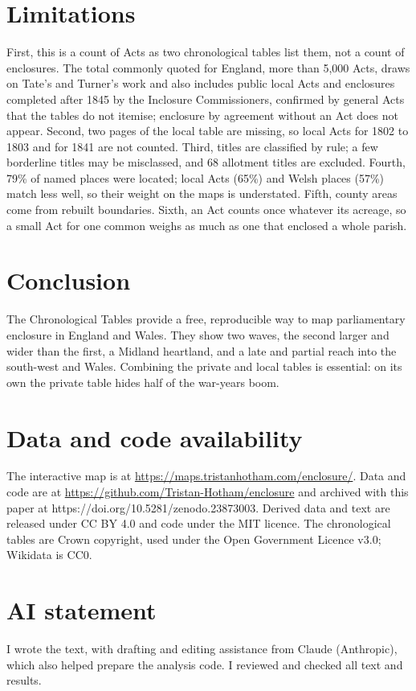 \documentclass[11pt,a4paper]{article}
\begin{document}
\section{Limitations}
First, this is a count of Acts as two chronological tables list them, not a count of enclosures. The total commonly quoted for England, more than 5,000 Acts, draws on Tate's and Turner's work and also includes public local Acts and enclosures completed after 1845 by the Inclosure Commissioners, confirmed by general Acts that the tables do not itemise; enclosure by agreement without an Act does not appear. Second, two pages of the local table are missing, so local Acts for 1802 to 1803 and for 1841 are not counted. Third, titles are classified by rule; a few borderline titles may be misclassed, and 68 allotment titles are excluded. Fourth, 79\% of named places were located; local Acts (65\%) and Welsh places (57\%) match less well, so their weight on the maps is understated. Fifth, county areas come from rebuilt boundaries. Sixth, an Act counts once whatever its acreage, so a small Act for one common weighs as much as one that enclosed a whole parish.

\section{Conclusion}
The Chronological Tables provide a free, reproducible way to map parliamentary enclosure in England and Wales. They show two waves, the second larger and wider than the first, a Midland heartland, and a late and partial reach into the south-west and Wales. Combining the private and local tables is essential: on its own the private table hides half of the war-years boom.

\section*{Data and code availability}
The interactive map is at \url{https://maps.tristanhotham.com/enclosure/}. Data and code are at \url{https://github.com/Tristan-Hotham/enclosure} and archived with this paper at https://doi.org/10.5281/zenodo.23873003. Derived data and text are released under CC BY 4.0 and code under the MIT licence. The chronological tables are Crown copyright, used under the Open Government Licence v3.0; Wikidata is CC0.

\section*{AI statement}
I wrote the text, with drafting and editing assistance from Claude (Anthropic), which also helped prepare the analysis code. I reviewed and checked all text and results.
\end{document}
